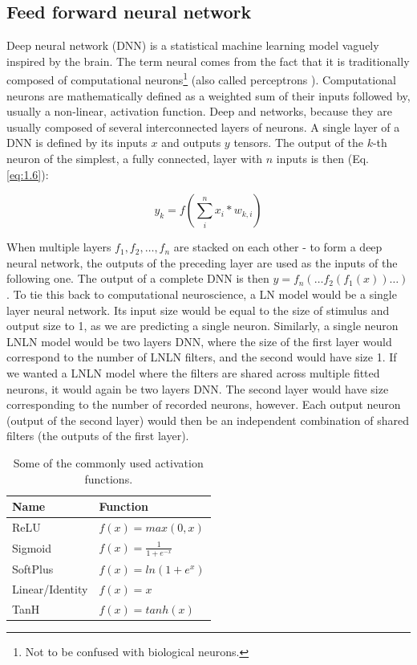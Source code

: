 \subsection{Feed forward neural network}
Deep neural network (DNN) is a statistical machine learning model vaguely inspired by the brain. The term neural comes from the fact that it is traditionally composed of computational neurons\footnote{Not to be confused with biological neurons.} (also called perceptrons \cite{Rosenblatt1958ThePA}). Computational neurons are mathematically defined as a weighted sum of their inputs followed by, usually a non-linear, activation function. Deep and networks, because they are usually composed of several interconnected layers of neurons. A single layer of a DNN is defined by its inputs $x$ and outputs $y$ tensors. The output of the $k$-th neuron of the simplest, a fully connected, layer with $n$ inputs is then (Eq. \ref{eq:1.6}):

\begin{equation}\label{eq:1.6}
    y_k = f(\sum_{i}^{n} x_{i} * w_{k,i})
\end{equation}

When multiple layers $f_1, f_2, \dots, f_n$ are stacked on each other - to form a deep neural network, the outputs of the preceding layer are used as the inputs of the following one. The output of a complete DNN is then $y = f_n(\dots f_2(f_1(x))\dots)$. To tie this back to computational neuroscience, a LN model would be a single layer neural network. Its input size would be equal to the size of stimulus and output size to 1, as we are predicting a single neuron. Similarly, a single neuron LNLN model would be two layers DNN, where the size of the first layer would correspond to the number of LNLN filters, and the second would have size 1. If we wanted a LNLN model where the filters are shared across multiple fitted neurons, it would again be two layers DNN. The second layer would have size corresponding to the number of recorded neurons, however. Each output neuron (output of the second layer) would then be an independent combination of shared filters (the outputs of the first layer).

\begin{table}[h]
    \renewcommand{\arraystretch}{1.2}
    \centering
    \begin{tabular}{l|l}
        \toprule
        \textbf{Name} & \textbf{Function} \\ \midrule
        ReLU & $f(x) = max(0, x)$ \\ 
        Sigmoid & $f(x) = \frac{1 }{1 + e^{-x} } $ \\ 
        SoftPlus & $f(x) = ln(1+e^x)$ \\ 
        Linear/Identity & $f(x) = x$ \\ 
        TanH & $f(x) = tanh(x)$ \\ \bottomrule

    \end{tabular}
    \caption[Commonly used activation functions]{Some of the commonly used activation functions\protect\footnotemark.}
    \label{tab:1.1}
    \renewcommand{\arraystretch}{1.0}
\end{table}

